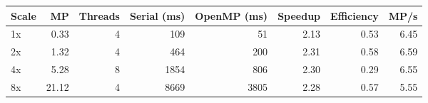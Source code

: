 \begin{tabular}{lrrrrrrr}
\toprule
Scale & MP & Threads & Serial (ms) & OpenMP (ms) & Speedup & Efficiency & MP/s \\
\midrule
1x & 0.33 & 4 & 109 & 51 & 2.13 & 0.53 & 6.45 \\
2x & 1.32 & 4 & 464 & 200 & 2.31 & 0.58 & 6.59 \\
4x & 5.28 & 8 & 1854 & 806 & 2.30 & 0.29 & 6.55 \\
8x & 21.12 & 4 & 8669 & 3805 & 2.28 & 0.57 & 5.55 \\
\bottomrule
\end{tabular}
